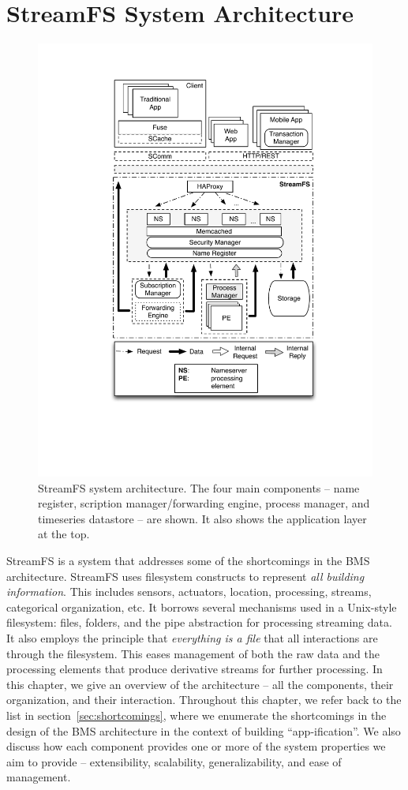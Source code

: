 \chapter{StreamFS System Architecture}
\label{chap:SFSArchMain}



\begin{figure}[th!] %
\centering
\includegraphics[width=0.65\columnwidth]{figs/sfsarch}
\caption{StreamFS system architecture.  The four main components -- name register, scription manager/forwarding engine, 
process manager, and timeseries datastore -- are shown.  It also shows the application layer at the top.}
\label{fig:sfsarch}
\end{figure}

StreamFS is a system that addresses some of the shortcomings in the BMS architecture.  StreamFS uses filesystem
constructs to represent \emph{all building information}.  This includes sensors, actuators, location, processing, 
streams, categorical organization, etc.  It borrows several mechanisms used in a Unix-style filesystem: files, folders,
and the pipe abstraction for processing streaming data.  It also employs the principle that \emph{everything is a file} 
that all interactions are through the filesystem.
This eases management of both the raw data and the processing elements that produce derivative streams for further processing.
In this chapter, we give an overview of the architecture -- all the components, their organization, and their interaction.
Throughout this chapter, we refer back to the list in section~\ref{sec:shortcomings}, where we enumerate the shortcomings
in the design of the BMS architecture in the context of building ``app-ification''.  We also discuss how each component 
provides one or more of the system properties we aim to provide -- extensibility, scalability, generalizability, and
ease of management.


